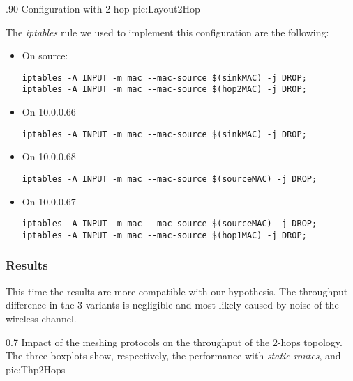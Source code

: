                 {.90\columnwidth}
                {Configuration with 2 hop}
                {pic:Layout2Hop}

         The \emph{iptables} rule we used to implement this
         configuration are the following:

         \begin{itemize}
         \item On source:

        \begin{verbatim}
iptables -A INPUT -m mac --mac-source $(sinkMAC) -j DROP;
iptables -A INPUT -m mac --mac-source $(hop2MAC) -j DROP;
        \end{verbatim}

        \item On 10.0.0.66
        \begin{verbatim}
iptables -A INPUT -m mac --mac-source $(sinkMAC) -j DROP;
        \end{verbatim}

        \item On 10.0.0.68
        \begin{verbatim}
iptables -A INPUT -m mac --mac-source $(sourceMAC) -j DROP;
        \end{verbatim}

        \item On 10.0.0.67
        \begin{verbatim}
iptables -A INPUT -m mac --mac-source $(sourceMAC) -j DROP;
iptables -A INPUT -m mac --mac-source $(hop1MAC) -j DROP;
        \end{verbatim}

        \end{itemize}

\subsubsection{Results}
        This time the results are more compatible with our
        hypothesis. The throughput difference in the 3 variants is
        negligible and most likely caused by noise of the wireless
        channel.

                {0.7 \columnwidth}
                {Impact of the meshing protocols on the throughput of the
                 2-hops topology. The three boxplots show, respectively,
                 the performance with \emph{static routes}, \emph{\batman}
                 and \emph{\olsr}}
                {pic:Thp2Hops}

